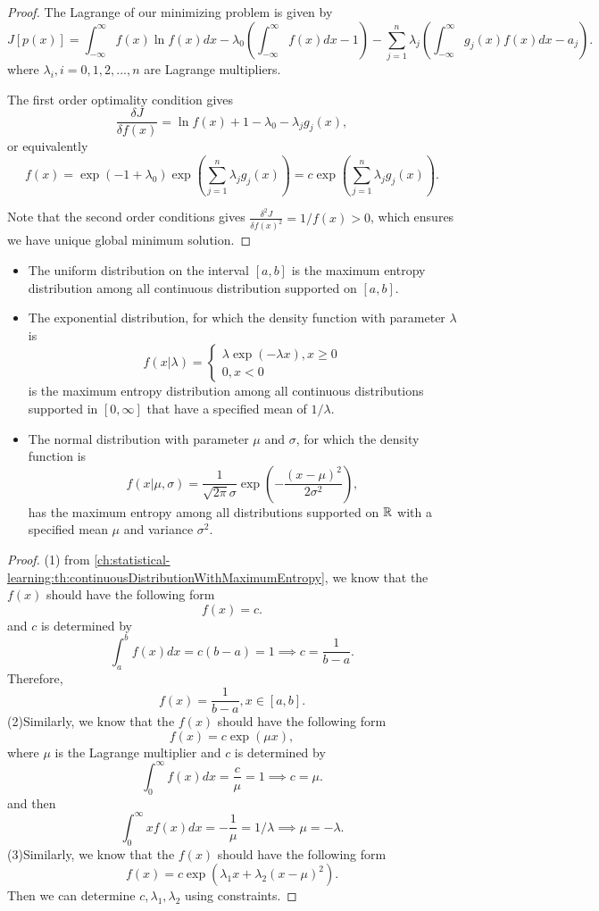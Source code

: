\begin{refsection}
\begin{proof}
	The Lagrange of our minimizing problem is given by
	$$J[p(x)] = \int_{-\infty}^{\infty} f(x)\ln f(x) dx - \lambda_0(\int_{-\infty}^{\infty} f(x) dx - 1) - \sum_{j=1}^{n} \lambda_j(\int_{-\infty}^{\infty} g_j(x)f(x) dx - a_j).$$
	where $\lambda_i,i=0,1,2,...,n$ are Lagrange multipliers.
	
	The first order optimality condition gives
	$$\frac{\delta J}{\delta f(x)} = \ln f(x) + 1 - \lambda_0 - \lambda_j g_j(x),$$
	or equivalently 
	$$f(x) = \exp(-1+\lambda_0) \exp(\sum_{j=1}^{n} \lambda_j g_j(x)) = c\exp(\sum_{j=1}^{n} \lambda_j g_j(x)).$$
	
	Note that the second order conditions gives $\frac{\delta^2 J}{\delta f(x)^2} = 1/f(x) > 0$, which ensures we have unique global minimum solution. 
\end{proof}


\begin{corollary}\hfill
	\begin{itemize}
		\item The uniform distribution on the interval $[a,b]$ is the maximum entropy distribution among all continuous distribution supported on $[a,b]$.
		\item The exponential distribution, for which the density function with parameter $\lambda$ is
		$$f(x|\lambda) = \begin{cases*}
		\lambda \exp(-\lambda x), x\geq 0\\
		0, x < 0
		\end{cases*}$$
		is the maximum entropy distribution among all continuous distributions supported in $[0,\infty]$ that have a specified mean of $1/\lambda$.
		\item The normal distribution with parameter $\mu$ and $\sigma$, for which the density function is
		$$f(x|\mu, \sigma) = \frac{1}{\sqrt{2\pi}\sigma} \exp(-\frac{(x-\mu)^2}{2\sigma^2}),$$
		has the maximum entropy among all distributions supported on $\mathbb{R}$ with a specified mean $\mu$ and variance $\sigma^2$.
	\end{itemize}	
\end{corollary}
\begin{proof}
	(1) from \autoref{ch:statistical-learning:th:continuousDistributionWithMaximumEntropy}, we know that the $f(x)$ should have the following form
	$$f(x) = c.$$
	and $c$ is determined by
	$$\int_{a}^b f(x)dx = c(b-a) = 1 \implies c = \frac{1}{b-a}.$$
	Therefore, 
	$$f(x) = \frac{1}{b-a},x\in [a,b].$$
	(2)Similarly,
	we know that the $f(x)$ should have the following form
	$$f(x) = c\exp(\mu x),$$
	where $\mu$ is the Lagrange multiplier
	and $c$ is determined by
	$$\int_{0}^\infty f(x)dx = \frac{c}{\mu} = 1 \implies c = \mu.$$
	and then
	$$\int_{0}^\infty xf(x)dx = -\frac{1}{\mu} = 1/\lambda \implies \mu = -\lambda.$$
	(3)Similarly,
	we know that the $f(x)$ should have the following form
	$$f(x) = c\exp(\lambda_1 x + \lambda_2(x-\mu)^2).$$
	Then we can determine $c,\lambda_1,\lambda_2$ using constraints.
\end{proof}



\end{refsection}

